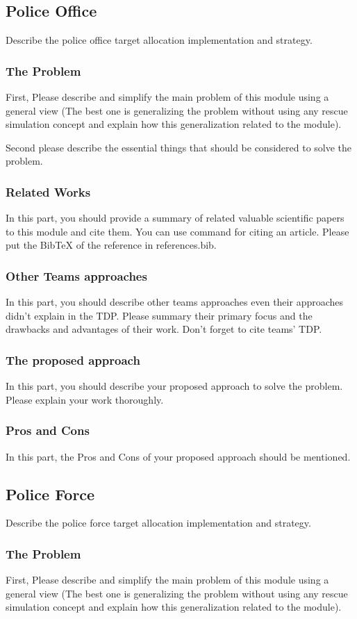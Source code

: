 \documentclass[runningheads,a4paper]{llncs}
\begin{document}
\subsection{Police Office}
Describe the police office target allocation implementation and strategy.
\subsubsection{The Problem}
First, Please describe and simplify the main problem of this module using a general view (The best one is generalizing the problem without using any rescue simulation concept and explain how this generalization related to the module).

Second please describe the essential things that should be considered to solve the problem.
\subsubsection{Related Works}
In this part, you should provide a summary of related valuable scientific papers to this module and cite them. You can use command \cite{ref1} for citing an article. Please put the BibTeX of the reference in references.bib.
\subsubsection{Other Teams approaches}
In this part, you should describe other teams approaches even their approaches didn't explain in the TDP. Please summary their primary focus and the drawbacks and advantages of their work. Don't forget to cite teams' TDP.
\subsubsection{The proposed approach}
In this part, you should describe your proposed approach to solve the problem. Please explain your work thoroughly.
\subsubsection{Pros and Cons}
In this part, the Pros and Cons of your proposed approach should be mentioned.

\subsection{Police Force}
Describe the police force target allocation implementation and strategy.
\subsubsection{The Problem}
First, Please describe and simplify the main problem of this module using a general view (The best one is generalizing the problem without using any rescue simulation concept and explain how this generalization related to the module).
\end{document}
